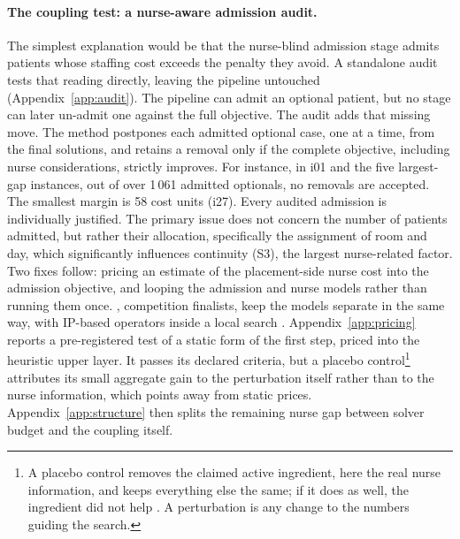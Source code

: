 \documentclass[11pt]{article}
\newcommand{\Sc}[1]{\textsf{S#1}}
\newcommand{\anote}[1]{\footnote{#1}}
\begin{document}
	\paragraph{The coupling test: a nurse-aware admission audit.}
	The simplest explanation would be that the nurse-blind admission stage
	admits patients whose staffing cost exceeds the penalty they avoid. A standalone audit tests that reading directly, leaving the pipeline untouched (Appendix~\ref{app:audit}). The pipeline can admit an optional patient, but no stage can later un-admit one against the full objective. The audit adds that missing move. The method postpones each admitted optional case, one at a time, from the final solutions, and retains a removal only if the complete objective, including nurse considerations, strictly improves. For instance, in i01 and the five largest-gap instances, out of over 1\,061 admitted optionals, no removals are accepted. The smallest margin is 58 cost units (i27). Every audited admission is individually justified. The primary issue does not concern the number of patients admitted, but rather their allocation, specifically the assignment of room and day, which significantly influences continuity (\Sc3), the largest nurse-related factor. Two fixes follow: pricing an estimate of the placement-side nurse cost into the admission
	objective, and looping the admission and nurse models rather than running them once.
	\citet{garciatercero2026}, competition finalists, keep the models separate in the same way, with IP-based operators inside a local search \citep{ihtc2024paper}.
	Appendix~\ref{app:pricing} reports a pre-registered test of a static form of the first step,
	priced into the heuristic upper layer. It passes its declared criteria, but a placebo control\anote{A placebo control removes the claimed active ingredient, here the real nurse information, and keeps everything else the same; if it does as well, the ingredient did not help \citep{shadish2002}. A perturbation is any change to the numbers guiding the search.} attributes its small aggregate gain to the perturbation itself rather than to the nurse information, which points away from static prices. Appendix~\ref{app:structure} then splits the remaining nurse gap between solver budget and the coupling itself.
	
\end{document}
